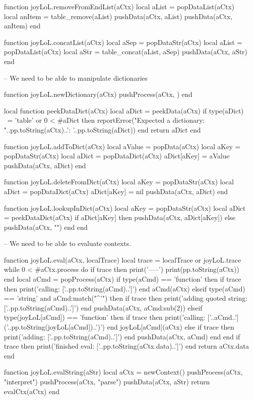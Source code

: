 {{{{function joyLoL.removeFromEndList(aCtx)
  local aList = popDataList(aCtx)
  local anItem = table_remove(aList)
  pushData(aCtx, aList)
  pushData(aCtx, anItem)
end

function joyLoL.concatList(aCtx)
  local aSep  = popDataStr(aCtx)
  local aList = popDataList(aCtx)
  local aStr = table_concat(aList, aSep)
  pushData(aCtx, aStr)
end

-- We need to be able to manipulate dictionaries

function joyLoL.newDictionary(aCtx)
  pushProcess(aCtx, {})
end

local function peekDataDict(aCtx)
  local aDict = peekData(aCtx)
  if type(aDict) ~= 'table' or 0 < #aDict then
    reportError("Expected a dictionary\naCtx: "..pp.toString(aCtx)..'\naDict: '..pp.toString(aDict))
  end
  return aDict
end

function joyLoL.addToDict(aCtx)
  local aValue = popData(aCtx)
  local aKey   = popDataStr(aCtx)
  local aDict  = popDataDict(aCtx)
  aDict[aKey] = aValue
  pushData(aCtx, aDict)
end

function joyLoL.deleteFromDict(aCtx)
  local aKey  = popDataStr(aCtx)
  local aDict = popDataDict(aCtx)
  aDict[aKey] = nil
  pushData(aCtx, aDict)
end

function joyLoL.lookupInDict(aCtx)
  local aKey  = popDataStr(aCtx)
  local aDict = peekDataDict(aCtx)
  if aDict[aKey] then
    pushData(aCtx, aDict[aKey])
  else
    pushData(aCtx, "")
  end
end

-- We need to be able to evaluate contexts.

function joyLoL.eval(aCtx, localTrace)
  local trace = localTrace or joyLoL.trace
  while 0 < #aCtx.process do
    if trace then
      print('\n\n-----')
      print(pp.toString(aCtx))
    end
    local aCmd = popProcess(aCtx)
    if type(aCmd) == 'function' then
      if trace then print('calling: ['..pp.toString(aCmd)..']') end
      aCmd(aCtx)
    elseif type(aCmd) == 'string' and aCmd:match("^'") then
      if trace then print('adding quoted string: ['..pp.toString(aCmd)..']') end
      pushData(aCtx, aCmd:sub(2))
    elseif type(joyLoL[aCmd]) == 'function' then
      if trace then print('calling: ['..aCmd..']('..pp.toString(joyLoL[aCmd])..')') end
      joyLoL[aCmd](aCtx)
    else
      if trace then print('adding: ['..pp.toString(aCmd)..']') end
      pushData(aCtx, aCmd)
    end
  end
  if trace then print('finished eval: ['..pp.toString(aCtx.data)..']') end
  return aCtx.data
end

function joyLoL.evalString(aStr)
  local aCtx = newContext()
  pushProcess(aCtx, "interpret")
  pushProcess(aCtx, "parse")
  pushData(aCtx, aStr)
  return evalCtx(aCtx)
end

}}}}
